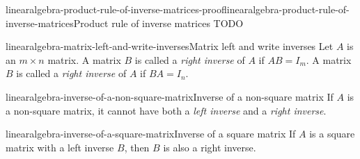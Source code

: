 \documentclass[preview]{standalone}
\begin{document}
\begin{snippetproof}{linearalgebra-product-rule-of-inverse-matrices-proof}{linearalgebra-product-rule-of-inverse-matrices}{Product rule of inverse matrices}
    TODO
\end{snippetproof}

\begin{snippetdefinition}{linearalgebra-matrix-left-and-write-inverses}{Matrix left and write inverses}
    Let \(A\) is an \(m \times n\) matrix. A matrix \(B\)
    is called a \textit{right inverse} of \(A\)
    if \(AB=I_m\).
    A matrix \(B\) is called a \textit{right inverse} of \(A\)
    if \(BA=I_n\).
\end{snippetdefinition}

\begin{snippetproposition}{linearalgebra-inverse-of-a-non-square-matrix}{Inverse of a non-square matrix}
    If \(A\) is a non-square matrix, it cannot have
    both a \textit{left inverse} and a \textit{right inverse}.
\end{snippetproposition}

\begin{snippetproposition}{linearalgebra-inverse-of-a-square-matrix}{Inverse of a square matrix}
    If \(A\) is a square matrix
    with a left inverse \(B\),
    then \(B\) is also a right inverse.
\end{snippetproposition}
\end{document}
